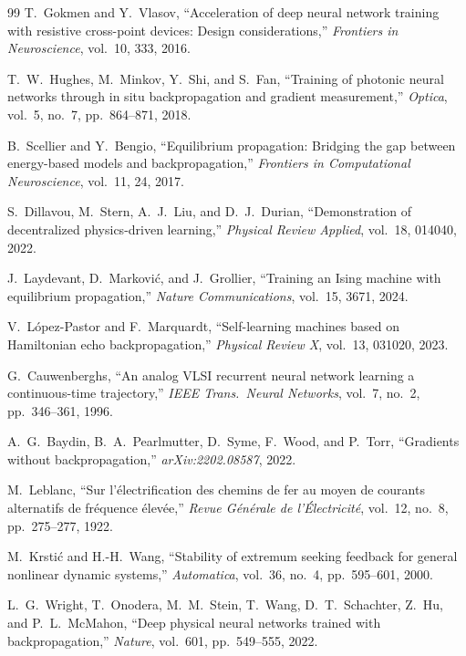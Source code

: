\documentclass[11pt]{article}
\begin{document}
\begin{thebibliography}{99}
 T.~Gokmen and Y.~Vlasov, ``Acceleration of deep neural network training with resistive cross-point devices: Design considerations,'' \textit{Frontiers in Neuroscience}, vol.~10, 333, 2016.

 T.~W.~Hughes, M.~Minkov, Y.~Shi, and S.~Fan, ``Training of photonic neural networks through in situ backpropagation and gradient measurement,'' \textit{Optica}, vol.~5, no.~7, pp.~864--871, 2018.

 B.~Scellier and Y.~Bengio, ``Equilibrium propagation: Bridging the gap between energy-based models and backpropagation,'' \textit{Frontiers in Computational Neuroscience}, vol.~11, 24, 2017.

 S.~Dillavou, M.~Stern, A.~J.~Liu, and D.~J.~Durian, ``Demonstration of decentralized physics-driven learning,'' \textit{Physical Review Applied}, vol.~18, 014040, 2022.

 J.~Laydevant, D.~Markovi\'c, and J.~Grollier, ``Training an Ising machine with equilibrium propagation,'' \textit{Nature Communications}, vol.~15, 3671, 2024.

 V.~L\'opez-Pastor and F.~Marquardt, ``Self-learning machines based on Hamiltonian echo backpropagation,'' \textit{Physical Review X}, vol.~13, 031020, 2023.

 G.~Cauwenberghs, ``An analog VLSI recurrent neural network learning a continuous-time trajectory,'' \textit{IEEE Trans.\ Neural Networks}, vol.~7, no.~2, pp.~346--361, 1996.

 A.~G.~Baydin, B.~A.~Pearlmutter, D.~Syme, F.~Wood, and P.~Torr, ``Gradients without backpropagation,'' \textit{arXiv:2202.08587}, 2022.

 M.~Leblanc, ``Sur l'\'electrification des chemins de fer au moyen de courants alternatifs de fr\'equence \'elev\'ee,'' \textit{Revue G\'en\'erale de l'\'Electricit\'e}, vol.~12, no.~8, pp.~275--277, 1922.

 M.~Krsti\'c and H.-H.~Wang, ``Stability of extremum seeking feedback for general nonlinear dynamic systems,'' \textit{Automatica}, vol.~36, no.~4, pp.~595--601, 2000.

 L.~G.~Wright, T.~Onodera, M.~M.~Stein, T.~Wang, D.~T.~Schachter, Z.~Hu, and P.~L.~McMahon, ``Deep physical neural networks trained with backpropagation,'' \textit{Nature}, vol.~601, pp.~549--555, 2022.


\end{thebibliography}
\end{document}
